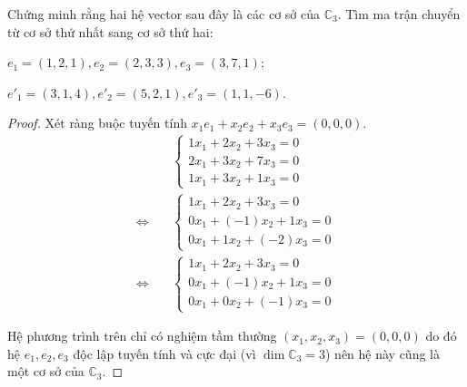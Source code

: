 \documentclass[class=linearalgebra,crop=false]{standalone}
\begin{document}
\begin{exercise}Chứng minh rằng hai hệ vector sau đây là các cơ sở của $\mathbb{C}_{3}$. Tìm ma trận chuyển từ cơ sở thứ nhất sang cơ sở thứ hai:
    \par $e_{1} = (1, 2, 1), e_{2} = (2, 3, 3), e_{3} = (3, 7, 1)$;
    \par $e'_{1} = (3, 1, 4), e'_{2} = (5, 2, 1), e'_{3} = (1, 1, -6)$.
\end{exercise}

\begin{proof}Xét ràng buộc tuyến tính $x_{1}e_{1} + x_{2}e_{2} + x_{3}e_{3} = (0, 0, 0)$.
    \begin{align*}
                             & \begin{cases}
            1x_{1} + 2x_{2} + 3x_{3} = 0 \\
            2x_{1} + 3x_{2} + 7x_{3} = 0 \\
            1x_{1} + 3x_{2} + 1x_{3} = 0
        \end{cases} \\
        \Leftrightarrow\quad &
        \begin{cases}
            1x_{1} + 2x_{2} + 3x_{3} = 0    \\
            0x_{1} + (-1)x_{2} + 1x_{3} = 0 \\
            0x_{1} + 1x_{2} + (-2)x_{3} = 0
        \end{cases}                        \\
        \Leftrightarrow\quad &
        \begin{cases}
            1x_{1} + 2x_{2} + 3x_{3} = 0    \\
            0x_{1} + (-1)x_{2} + 1x_{3} = 0 \\
            0x_{1} + 0x_{2} + (-1)x_{3} = 0
        \end{cases}
    \end{align*}
    \par Hệ phương trình trên chỉ có nghiệm tầm thường $(x_{1}, x_{2}, x_{3}) = (0, 0, 0)$ do đó hệ $e_{1}, e_{2}, e_{3}$ độc lập tuyến tính và cực đại (vì $\dim\mathbb{C}_{3} = 3$) nên hệ này cũng là một cơ sở của $\mathbb{C}_{3}$.


\end{proof}
\end{document}
